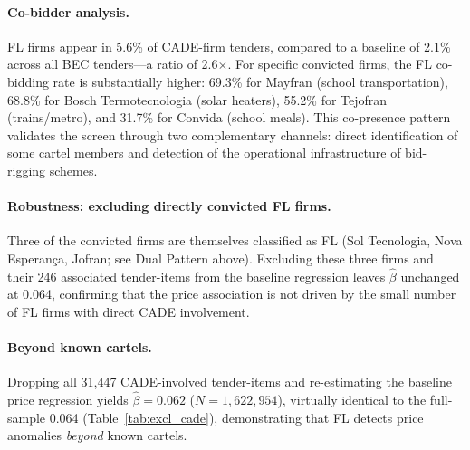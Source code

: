 \paragraph{Co-bidder analysis.}
FL firms appear in 5.6\% of CADE-firm tenders, compared to a baseline
of 2.1\% across all BEC tenders---a ratio of 2.6$\times$. For specific
convicted firms, the FL co-bidding rate is substantially higher:
69.3\% for Mayfran (school transportation), 68.8\% for Bosch
Termotecnologia (solar heaters), 55.2\% for Tejofran (trains/metro),
and 31.7\% for Convida (school meals). This co-presence pattern
validates the screen through two complementary channels: direct
identification of some cartel members and detection of the
operational infrastructure of bid-rigging schemes.

\paragraph{Robustness: excluding directly convicted FL firms.}
Three of the convicted firms are themselves classified as FL (Sol
Tecnologia, Nova Esperan\c{c}a, Jofran; see Dual Pattern above).
Excluding these three firms and their 246 associated tender-items from
the baseline regression leaves $\hat{\beta}$ unchanged at 0.064,
confirming that the price association is not driven by the small
number of FL firms with direct CADE involvement.

\paragraph{Beyond known cartels.}
Dropping all 31,447 CADE-involved tender-items and re-estimating the
baseline price regression yields $\hat{\beta} = 0.062$ ($N =
1{,}622{,}954$), virtually identical to the full-sample 0.064
(Table~\ref{tab:excl_cade}), demonstrating that FL detects price
anomalies \emph{beyond} known cartels.

